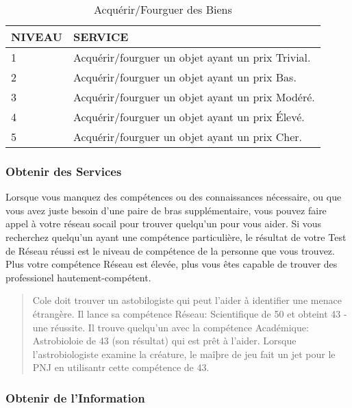 \begin{table} \caption{Acquérir/Fourguer des Biens} \begin{tabular}{|I|I|} \hline

NIVEAU &SERVICE \\ \hline

1 &Acquérir/fourguer un objet ayant un prix Trivial. \\ \hline

2 &Acquérir/fourguer un objet ayant un prix Bas. \\ \hline

3 &Acquérir/fourguer un objet ayant un prix Modéré. \\ \hline

4 &Acquérir/fourguer un objet ayant un prix Élevé. \\ \hline

5 &Acquérir/fourguer un objet ayant un prix Cher. \\ \hline

\end{tabular} \end{table} 



\subsubsection{Obtenir des Services} 

Lorsque vous manquez des compétences ou des connaissances nécessaire, ou que vous avez juste besoin d'une paire de bras supplémentaire, vous pouvez faire appel à votre réseau socail pour trouver quelqu'un pour vous aider. Si vous recherchez quelqu'un ayant une compétence particulière, le résultat de votre Test de Réseau réussi est le niveau de compétence de la personne que vous trouvez. Plus votre compétence Réseau est élevée, plus vous êtes capable de trouver des professionel hautement-compétent. 

\begin{quotation} Cole doit trouver un astobilogiste qui peut l'aider à identifier une menace étrangère. Il lance sa compétence Réseau: Scientifique de 50 et obteint 43 - une réussite. Il trouve quelqu'un avec la compétence Académique: Astrobioloie de 43 (son résultat) qui est prêt à l'aider. Lorsque l'astrobiologiste examine la créature, le maîþre de jeu fait un jet pour le PNJ en utilisantr cette compétence de 43. \end{quotation} 



\subsubsection{Obtenir de l'Information} 


